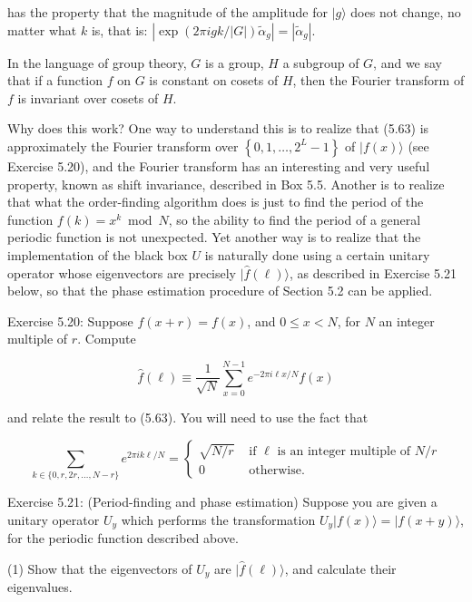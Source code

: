 has the property that the magnitude of the amplitude for $|g\rangle$ does not change, no matter what $k$ is, that is: $\left|\exp (2 \pi i g k /|G|) \tilde{\alpha}_{g}\right|=\left|\tilde{\alpha}_{g}\right|$.

In the language of group theory, $G$ is a group, $H$ a subgroup of $G$, and we say that if a function $f$ on $G$ is constant on cosets of $H$, then the Fourier transform of $f$ is invariant over cosets of $H$.

Why does this work? One way to understand this is to realize that (5.63) is approximately the Fourier transform over $\left\{0,1, \ldots, 2^{L}-1\right\}$ of $|f(x)\rangle$ (see Exercise 5.20), and the Fourier transform has an interesting and very useful property, known as shift invariance, described in Box 5.5. Another is to realize that what the order-finding algorithm does is just to find the period of the function $f(k)=x^{k} \bmod N$, so the ability to find the period of a general periodic function is not unexpected. Yet another way is to realize that the implementation of the black box $U$ is naturally done using a certain unitary operator whose eigenvectors are precisely $|\hat{f}(\ell)\rangle$, as described in Exercise 5.21 below, so that the phase estimation procedure of Section 5.2 can be applied.

Exercise 5.20: Suppose $f(x+r)=f(x)$, and $0 \leq x<N$, for $N$ an integer multiple of $r$. Compute

\begin{equation*}
\hat{f}(\ell) \equiv \frac{1}{\sqrt{N}} \sum_{x=0}^{N-1} e^{-2 \pi i \ell x / N} f(x) \tag{5.68}
\end{equation*}

and relate the result to (5.63). You will need to use the fact that

\begin{equation*}
\sum_{k \in\{0, r, 2 r, \ldots, N-r\}} e^{2 \pi i k \ell / N}= \begin{cases}\sqrt{N / r} & \text { if } \ell \text { is an integer multiple of } N / r  \tag{5.69}\\ 0 & \text { otherwise. }\end{cases}
\end{equation*}

Exercise 5.21: (Period-finding and phase estimation) Suppose you are given a unitary operator $U_{y}$ which performs the transformation $U_{y}|f(x)\rangle=|f(x+y)\rangle$, for the periodic function described above.

(1) Show that the eigenvectors of $U_{y}$ are $|\hat{f}(\ell)\rangle$, and calculate their eigenvalues.

